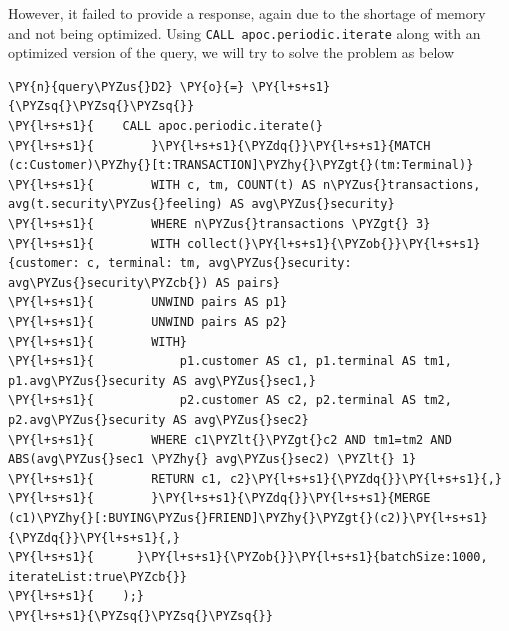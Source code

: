     However, it failed to provide a response, again due to the shortage of
memory and not being optimized. Using
\texttt{CALL\ apoc.periodic.iterate} along with an optimized version of
the query, we will try to solve the problem as below

    \begin{tcolorbox}[breakable, size=fbox, boxrule=1pt, pad at break*=1mm,colback=cellbackground, colframe=cellborder]
\begin{Verbatim}[commandchars=\\\{\}]
\PY{n}{query\PYZus{}D2} \PY{o}{=} \PY{l+s+s1}{\PYZsq{}\PYZsq{}\PYZsq{}}
\PY{l+s+s1}{    CALL apoc.periodic.iterate(}
\PY{l+s+s1}{        }\PY{l+s+s1}{\PYZdq{}}\PY{l+s+s1}{MATCH (c:Customer)\PYZhy{}[t:TRANSACTION]\PYZhy{}\PYZgt{}(tm:Terminal)}
\PY{l+s+s1}{        WITH c, tm, COUNT(t) AS n\PYZus{}transactions, avg(t.security\PYZus{}feeling) AS avg\PYZus{}security}
\PY{l+s+s1}{        WHERE n\PYZus{}transactions \PYZgt{} 3}
\PY{l+s+s1}{        WITH collect(}\PY{l+s+s1}{\PYZob{}}\PY{l+s+s1}{customer: c, terminal: tm, avg\PYZus{}security: avg\PYZus{}security\PYZcb{}) AS pairs}
\PY{l+s+s1}{        UNWIND pairs AS p1}
\PY{l+s+s1}{        UNWIND pairs AS p2}
\PY{l+s+s1}{        WITH}
\PY{l+s+s1}{            p1.customer AS c1, p1.terminal AS tm1, p1.avg\PYZus{}security AS avg\PYZus{}sec1,}
\PY{l+s+s1}{            p2.customer AS c2, p2.terminal AS tm2, p2.avg\PYZus{}security AS avg\PYZus{}sec2}
\PY{l+s+s1}{        WHERE c1\PYZlt{}\PYZgt{}c2 AND tm1=tm2 AND ABS(avg\PYZus{}sec1 \PYZhy{} avg\PYZus{}sec2) \PYZlt{} 1}
\PY{l+s+s1}{        RETURN c1, c2}\PY{l+s+s1}{\PYZdq{}}\PY{l+s+s1}{,}
\PY{l+s+s1}{        }\PY{l+s+s1}{\PYZdq{}}\PY{l+s+s1}{MERGE (c1)\PYZhy{}[:BUYING\PYZus{}FRIEND]\PYZhy{}\PYZgt{}(c2)}\PY{l+s+s1}{\PYZdq{}}\PY{l+s+s1}{,}
\PY{l+s+s1}{      }\PY{l+s+s1}{\PYZob{}}\PY{l+s+s1}{batchSize:1000, iterateList:true\PYZcb{}}
\PY{l+s+s1}{    );}
\PY{l+s+s1}{\PYZsq{}\PYZsq{}\PYZsq{}}
\end{Verbatim}
\end{tcolorbox}

